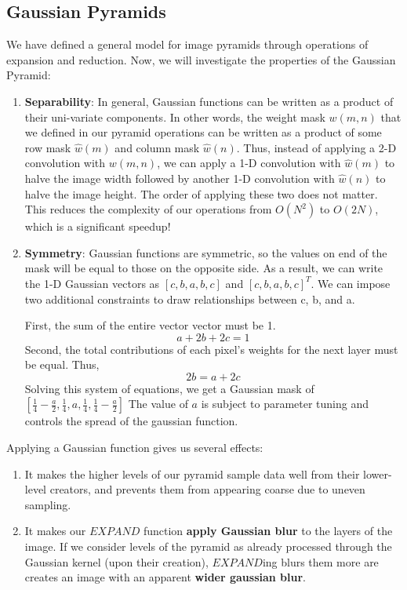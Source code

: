 \documentclass{article}
\begin{document}
\subsection{Gaussian Pyramids}
We have defined a general model for image pyramids through operations of expansion and reduction.  Now, we will investigate the properties of the Gaussian Pyramid:
\begin{enumerate}
    \item \textbf{Separability}: In general, Gaussian functions can be written as a product of their uni-variate components.  In other words, the weight mask $w(m,n)$ that we defined in our pyramid operations can be written as a product of some row mask $\hat{w}(m)$ and column mask $\hat{w}(n)$.  Thus, instead of applying a 2-D convolution with $w(m,n)$, we can apply a 1-D convolution with $\hat{w}(m)$ to halve the image width followed by another 1-D convolution with $\hat{w}(n)$ to halve the image height.  The order of applying these two  does not matter.  This reduces the complexity of our operations from $O(N^2)$ to $O(2N)$, which is a significant speedup!
    \item \textbf{Symmetry}: Gaussian functions are symmetric, so the values on end of the mask will be equal to those on the opposite side.  As a result, we can write the 1-D Gaussian vectors as $[c, b, a, b, c]$ and $[c, b, a, b, c]^T$. We can impose two additional constraints to draw relationships between c, b, and a.  
    
    First, the sum of the entire vector vector must be 1. 
    \begin{equation}
        a + 2b + 2c = 1
    \end{equation}
    Second, the total contributions of each pixel's weights for the next layer must be equal. Thus,
    \begin{equation}
        2b = a + 2c
    \end{equation}
    Solving this system of equations, we get a Gaussian mask of $[\frac{1}{4}-\frac{a}{2}, \frac{1}{4}, a, \frac{1}{4}, \frac{1}{4}-\frac{a}{2}]$
    The value of $a$ is subject to parameter tuning and controls the spread of the gaussian function.
\end{enumerate}

Applying a Gaussian function gives us several effects:
\begin{enumerate}
\item It makes the higher levels of our pyramid sample data well from their lower-level creators, and prevents them from appearing coarse due to uneven sampling.
\item It makes our $EXPAND$ function \textbf{apply Gaussian blur} to the layers of the image. If we consider levels of the pyramid as already processed through the Gaussian kernel (upon their creation), $EXPAND$ing blurs them more are creates an image with an apparent \textbf{wider gaussian blur}.
\end{enumerate}
\end{document}
